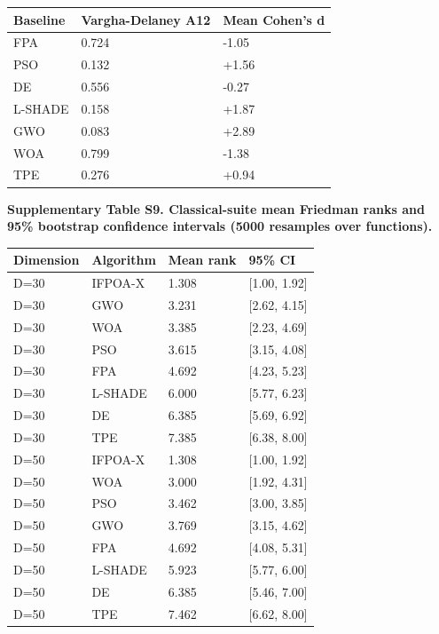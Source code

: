 \documentclass[
  9pt,
]{extarticle}
\newcounter{none} %
\begin{document}
{\def\LTcaptype{none} %
\begin{longtable}[]{@{}lll@{}}
\toprule\noalign{}
Baseline & Vargha-Delaney A12 & Mean Cohen's d \\
\midrule\noalign{}
\endhead
\bottomrule\noalign{}
\endlastfoot
FPA & 0.724 & -1.05 \\
PSO & 0.132 & +1.56 \\
DE & 0.556 & -0.27 \\
L-SHADE & 0.158 & +1.87 \\
GWO & 0.083 & +2.89 \\
WOA & 0.799 & -1.38 \\
TPE & 0.276 & +0.94 \\
\end{longtable}
}

\textbf{Supplementary Table S9. Classical-suite mean Friedman ranks and
95\% bootstrap confidence intervals (5000 resamples over functions).}

{\def\LTcaptype{none} %
\begin{longtable}[]{@{}llll@{}}
\toprule\noalign{}
Dimension & Algorithm & Mean rank & 95\% CI \\
\midrule\noalign{}
\endhead
\bottomrule\noalign{}
\endlastfoot
D=30 & IFPOA-X & 1.308 & {[}1.00, 1.92{]} \\
D=30 & GWO & 3.231 & {[}2.62, 4.15{]} \\
D=30 & WOA & 3.385 & {[}2.23, 4.69{]} \\
D=30 & PSO & 3.615 & {[}3.15, 4.08{]} \\
D=30 & FPA & 4.692 & {[}4.23, 5.23{]} \\
D=30 & L-SHADE & 6.000 & {[}5.77, 6.23{]} \\
D=30 & DE & 6.385 & {[}5.69, 6.92{]} \\
D=30 & TPE & 7.385 & {[}6.38, 8.00{]} \\
D=50 & IFPOA-X & 1.308 & {[}1.00, 1.92{]} \\
D=50 & WOA & 3.000 & {[}1.92, 4.31{]} \\
D=50 & PSO & 3.462 & {[}3.00, 3.85{]} \\
D=50 & GWO & 3.769 & {[}3.15, 4.62{]} \\
D=50 & FPA & 4.692 & {[}4.08, 5.31{]} \\
D=50 & L-SHADE & 5.923 & {[}5.77, 6.00{]} \\
D=50 & DE & 6.385 & {[}5.46, 7.00{]} \\
D=50 & TPE & 7.462 & {[}6.62, 8.00{]} \\
\end{longtable}
}
\end{document}
